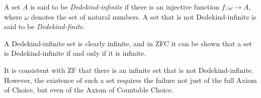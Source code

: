 \documentclass{article}
\begin{document}

A set $A$ is said to be \emph{Dedekind-infinite}
if there is an injective function $f\colon\omega\to A$,
where $\omega$ denotes the set of natural numbers.
A set that is not Dedekind-infinite is said to be \emph{Dedekind-finite}.

A Dedekind-infinite set is clearly infinite,
and in ZFC it can be shown that
a set is Dedekind-infinite if and only if it is infinite.

It is consistent with ZF that
there is an infinite set that is not Dedekind-infinite.
However, the existence of such a set requires the failure
not just of the full Axiom of Choice, but even of the Axiom of Countable Choice.
\end{document}
